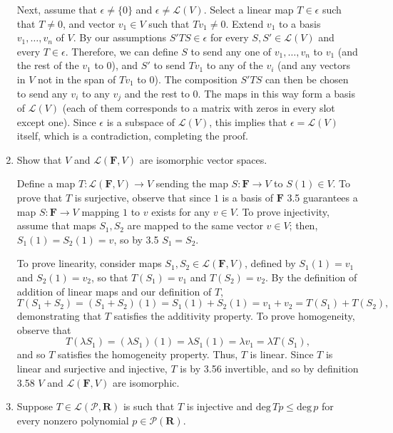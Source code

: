 \documentclass{book}
\begin{document}
\begin{enumerate}
Next, assume that \(\epsilon \neq \{0\}\) and \(\epsilon \neq \mathcal{L}(V)\).  Select a linear map \(T \in \epsilon\) such that \(T \neq 0\), and vector \(v_1 \in V\) such that \(Tv_1 \neq 0\).  Extend \(v_1\) to a basis \(v_1,\dots,v_n\) of \(V\).  By our assumptions \(S'TS \in \epsilon\) for every \(S, S' \in \mathcal{L}(V)\) and every \(T \in \epsilon\).  Therefore, we can define \(S\) to send any one of \(v_1,\dots,v_n\) to \(v_1\) (and the rest of the \(v_1\) to \(0\)), and \(S'\) to send \(Tv_1\) to any of the \(v_i\) (and any vectors in \(V\) not in the span of \(Tv_1\) to \(0\)).  The composition \(S'TS\) can then be chosen to send any \(v_i\) to any \(v_j\) and the rest to \(0\).  The maps in this way form a basis of \(\mathcal{L}(V)\) (each of them corresponds to a matrix with zeros in every slot except one).  Since \(\epsilon\) is a subspace of \(\mathcal{L}(V)\), this implies that \(\epsilon = \mathcal{L}(V)\) itself, which is a contradiction, completing the proof.

\item Show that \(V\) and \(\mathcal{L}(\textbf{F},V)\) are isomorphic vector spaces.

Define a map \(T: \mathcal{L}(\textbf{F},V) \rightarrow V\) sending the map \(S:\textbf{F} \rightarrow V\) to \(S(1) \in V\).  To prove that \(T\) is surjective, observe that since \(1\) is a basis of \(\textbf{F}\) 3.5 guarantees a map \(S:\textbf{F} \rightarrow V\) mapping \(1\) to \(v\) exists for any \(v \in V\).  To prove injectivity, assume that maps \(S_1,S_2\) are mapped to the same vector \(v \in V\); then, \(S_1(1)=S_2(1)=v\), so by 3.5 \(S_1=S_2\).

To prove linearity, consider maps \(S_1,S_2 \in \mathcal{L}(\textbf{F},V)\), defined by \(S_1(1)=v_1\) and \(S_2(1)=v_2\), so that \(T(S_1)=v_1\) and \(T(S_2)=v_2\).  By the definition of addition of linear maps and our definition of \(T\), \[T(S_1+S_2)=(S_1+S_2)(1)=S_1(1)+S_2(1) = v_1+v_2=T(S_1)+T(S_2),\] demonstrating that \(T\) satisfies the additivity property.  To prove homogeneity, observe that \[T(\lambda S_1)=(\lambda S_1)(1)=\lambda S_1(1)=\lambda v_1=\lambda T(S_1),\] and so \(T\) satisfies the homogeneity property.  Thus, \(T\) is linear.  Since \(T\) is linear and surjective and injective, \(T\) is by 3.56 invertible, and so by definition 3.58 \(V\) and \(\mathcal{L}(\textbf{F},V)\) are isomorphic.

\item Suppose \(T \in \mathcal{L}(\mathcal{P},\textbf{R})\) is such that \(T\) is injective and \(\textrm{deg} \, Tp \leq \textrm{deg} \, p\) for every nonzero polynomial \(p \in \mathcal{P}(\textbf{R})\).


\end{enumerate}
\end{document}
